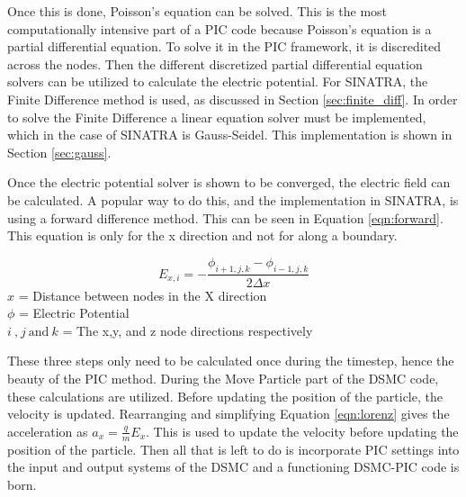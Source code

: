 \indent Once this is done, Poisson's equation can be solved. This is the most computationally intensive part of a PIC code because Poisson's equation is a partial differential equation. To solve it in the PIC framework, it is discredited across the nodes. Then the different discretized partial differential equation solvers can be utilized to calculate the electric potential. For SINATRA, the Finite Difference method is used, as discussed in Section \ref{sec:finite_diff}. In order to solve the Finite Difference a linear equation solver must be implemented, which in the case of SINATRA is Gauss-Seidel. This implementation is shown in Section \ref{sec:gauss}. \par

\indent Once the electric potential solver is shown to be converged, the electric field can be calculated. A popular way to do this, and the implementation in SINATRA, is using a forward difference method. This can be seen in Equation \ref{eqn:forward}. This equation is only for the x direction and not for along a boundary. \par

\begin{equation}
    \label{eqn:forward}
    E_{x,i} = - \frac{\phi_{i+1,j,k} - \phi_{i-1,j,k}}{2 \Delta x}
\end{equation}
\(x\) = Distance between nodes in the X direction \\
\(\phi\) = Electric Potential \\
\(i \: \text{,} \: j \: \text{and} \: k\) = The x,y, and z node directions respectively  \par

\indent These three steps only need to be calculated once during the timestep, hence the beauty of the PIC method. During the Move Particle part of the DSMC code, these calculations are utilized. Before updating the position of the particle, the velocity is updated. Rearranging and simplifying Equation \ref{eqn:lorenz} gives the acceleration as \(a_x = \frac{q}{m} E_x\). This is used to update the velocity before updating the position of the particle. Then all that is left to do is incorporate PIC settings into the input and output systems of the DSMC and a functioning DSMC-PIC code is born. 








